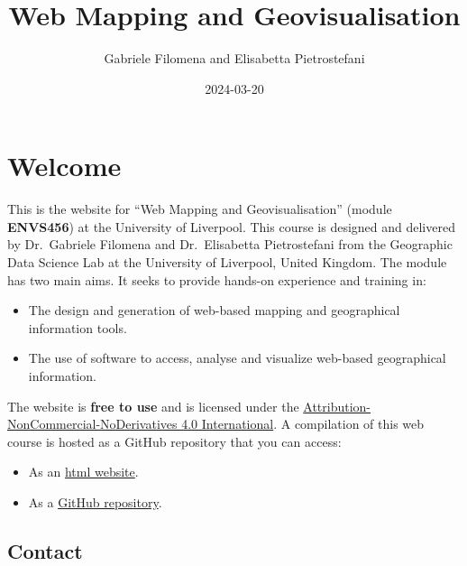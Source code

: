 \documentclass[
  letterpaper,
  DIV=11,
  numbers=noendperiod]{scrreprt}
\title{Web Mapping and Geovisualisation}
\author{Gabriele Filomena and Elisabetta Pietrostefani}
\date{2024-03-20}
\providecommand{\tightlist}{%
  \setlength{\itemsep}{0pt}\setlength{\parskip}{0pt}}\usepackage{longtable,booktabs,array}
\renewcommand*\contentsname{Table of contents}
\newcommand\contentsname{Table of contents}
\begin{document}
\maketitle
\ifdefined\Shaded\renewenvironment{Shaded}{\begin{tcolorbox}[breakable, enhanced, interior hidden, borderline west={3pt}{0pt}{shadecolor}, boxrule=0pt, sharp corners, frame hidden]}{\end{tcolorbox}}\fi

\renewcommand*\contentsname{Table of contents}
{
\hypersetup{linkcolor=}
\setcounter{tocdepth}{2}
\tableofcontents
}

\hypertarget{welcome}{%
\chapter*{Welcome}\label{welcome}}


This is the website for ``Web Mapping and Geovisualisation'' (module
\textbf{ENVS456}) at the University of Liverpool. This course is
designed and delivered by Dr.~Gabriele Filomena and Dr.~Elisabetta
Pietrostefani from the Geographic Data Science Lab at the University of
Liverpool, United Kingdom. The module has two main aims. It seeks to
provide hands-on experience and training in:

\begin{itemize}
\tightlist
\item
  The design and generation of web-based mapping and geographical
  information tools.
\item
  The use of software to access, analyse and visualize web-based
  geographical information.
\end{itemize}

The website is \textbf{free to use} and is licensed under the
\href{https://creativecommons.org/licenses/by-nc-nd/4.0/}{Attribution-NonCommercial-NoDerivatives
4.0 International}. A compilation of this web course is hosted as a
GitHub repository that you can access:

\begin{itemize}
\tightlist
\item
  As an \href{https://gdsl-ul.github.io/wma}{html website}.
\item
  As a \href{https://github.com/GDSL-UL/wma}{GitHub repository}.
\end{itemize}

\hypertarget{contact}{%
\section*{Contact}\label{contact}}
\end{document}
